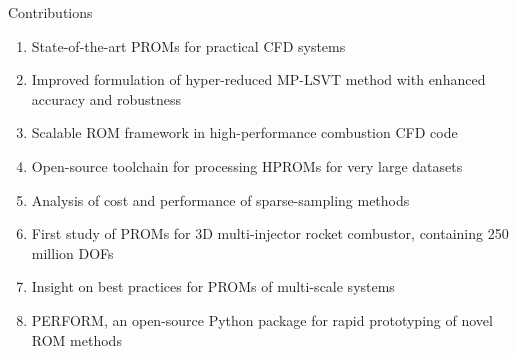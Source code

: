 \documentclass[]{beamer}
\begin{document}
\begin{frame}{Contributions}
    \begin{enumerate}
        \item State-of-the-art PROMs for practical CFD systems
        \item Improved formulation of hyper-reduced MP-LSVT method with enhanced accuracy and robustness
        \item Scalable ROM framework in high-performance combustion CFD code
        \item Open-source toolchain for processing HPROMs for very large datasets
        \item Analysis of cost and performance of sparse-sampling methods
        \item First study of PROMs for 3D multi-injector rocket combustor, containing 250 million DOFs
        \item Insight on best practices for PROMs of multi-scale systems
        \item PERFORM, an open-source Python package for rapid prototyping of novel ROM methods
    \end{enumerate}
\end{frame}
\end{document}
